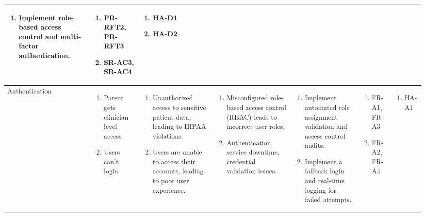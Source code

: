 \documentclass{article}
\begin{document}
\begin{landscape}
\begin{longtable}{|p{3cm}|p{3cm}|p{4cm}|p{4cm}|p{3cm}|p{2cm}|p{3cm}|}
\begin{enumerate}[leftmargin=*]
       \item Implement role-based access control and multi-factor authentication.
  \end{enumerate} &
  \begin{enumerate}[leftmargin=*]
       \item PR-RFT2, PR-RFT3
       \item SR-AC3, SR-AC4
  \end{enumerate} &
  \begin{enumerate}[leftmargin=*]
       \item HA-D1
       \item HA-D2
  \end{enumerate} \\
  \hline
  Authentication & 
  \begin{enumerate}[leftmargin=*]
      \item Parent gets clinician level access
      \item Users can't login
  \end{enumerate} & 
  \begin{enumerate}[leftmargin=*]
      \item Unauthorized access to sensitive patient data, leading to HIPAA violations.
      \item Users are unable to access their accounts, leading to poor user experience.
  \end{enumerate} &
  \begin{enumerate}[leftmargin=*]
       \item Misconfigured role-based access control (RBAC) leads to incorrect user roles.
       \item Authentication service downtime, credential validation issues.
  \end{enumerate} &
  \begin{enumerate}[leftmargin=*]
       \item Implement automated role assignment validation and access control audits.
       \item Implement a fallback login and real-time logging for failed attempts.
  \end{enumerate} &
  \begin{enumerate}[leftmargin=*]
       \item FR-A1, FR-A3
       \item FR-A2, FR-A4
  \end{enumerate} &
  \begin{enumerate}[leftmargin=*]
       \item HA-A1

\end{enumerate}
\end{longtable}
\end{landscape}
\end{document}

